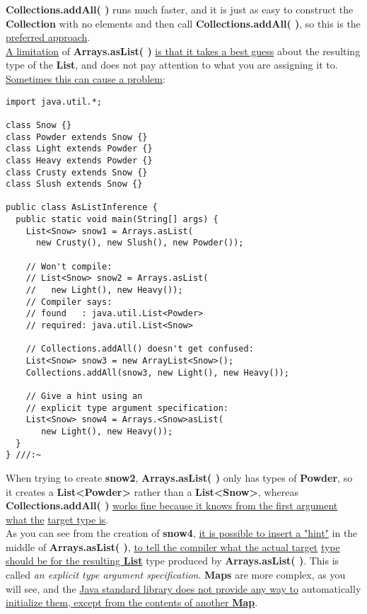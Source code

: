 \documentclass[10pt,letterpaper]{report}
\begin{document}
\textbf{Collections.addAll( )} runs much faster, and it is just as easy to construct the \textbf{Collection} with no elements and then call \textbf{Collections.addAll( )}, so this is the \underline{preferred approach}.\\
\underline{A limitation} of \textbf{Arrays.asList( )} \underline{is that it takes a best guess} about the resulting type of the \textbf{List}, and does not pay attention to what you are assigning it to. \underline{Sometimes this can cause a problem}:
\begin{lstlisting}
import java.util.*;

class Snow {}
class Powder extends Snow {}
class Light extends Powder {}
class Heavy extends Powder {}
class Crusty extends Snow {}
class Slush extends Snow {}

public class AsListInference {
  public static void main(String[] args) {
    List<Snow> snow1 = Arrays.asList(
      new Crusty(), new Slush(), new Powder());

    // Won't compile:
    // List<Snow> snow2 = Arrays.asList(
    //   new Light(), new Heavy());
    // Compiler says:
    // found   : java.util.List<Powder>
    // required: java.util.List<Snow>

    // Collections.addAll() doesn't get confused:
    List<Snow> snow3 = new ArrayList<Snow>();
    Collections.addAll(snow3, new Light(), new Heavy());

    // Give a hint using an
    // explicit type argument specification:
    List<Snow> snow4 = Arrays.<Snow>asList(
       new Light(), new Heavy());
  }
} ///:~
\end{lstlisting}

When trying to create \textbf{snow2}, \textbf{Arrays.asList( )} only has types of \textbf{Powder}, so it creates a \textbf{List\textless Powder\textgreater} rather than a \textbf{List\textless Snow\textgreater}, whereas \textbf{Collections.addAll( )} \underline{works fine because it knows from the first argument what the} \underline{target type is}.\\
As you can see from the creation of \textbf{snow4}, \underline{it is possible to insert a "hint"} in the middle of \textbf{Arrays.asList( )}, \underline{to tell the compiler what the actual target} \underline{type should be for the resulting \textbf{List}} type produced by \textbf{Arrays.asList( )}. This is called \textit{an explicit type argument specification}.
\textbf{Maps} are more complex, as you will see, and the \underline{Java standard library does not provide any way to} automatically \underline{initialize them, except from the contents of another \textbf{Map}}.
\end{document}
